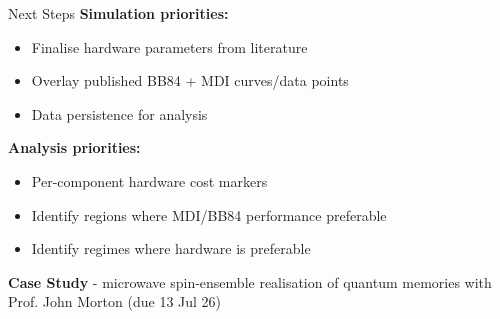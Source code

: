 \documentclass[10pt]{beamer}
\begin{document}
\begin{frame}{Next Steps}
    \textbf{Simulation priorities:}
    \begin{itemize}
        \item Finalise hardware parameters from literature
        \item Overlay published BB84 + MDI curves/data points
        \item Data persistence for analysis
    \end{itemize}

    \vspace{0.15cm}
    \textbf{Analysis priorities:}
    \begin{itemize}
        \item Per-component hardware cost markers
        \item Identify regions where MDI/BB84 performance preferable
        \item Identify regimes where hardware is preferable
    \end{itemize}

    \textbf{Case Study} - microwave spin-ensemble realisation of quantum memories with Prof. John Morton (due 13 Jul 26)
\end{frame}
\end{document}
